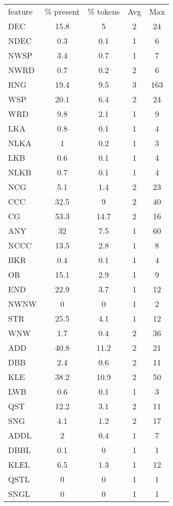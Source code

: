 \begin{center}
\begin{tabular}{lcccc}
\toprule
feature & \% present & \% tokens & Avg & Max \\ 
DEC & 15.8 & 5 & 2 & 24 \\ 
\midrule
NDEC & 0.3 & 0.1 & 1 & 6 \\ 
\midrule
NWSP & 3.4 & 0.7 & 1 & 7 \\ 
\midrule
NWRD & 0.7 & 0.2 & 2 & 6 \\ 
\midrule
RNG & 19.4 & 9.5 & 3 & 163 \\ 
\midrule
WSP & 20.1 & 6.4 & 2 & 24 \\ 
\midrule
WRD & 9.8 & 2.1 & 1 & 9 \\ 
\midrule
LKA & 0.8 & 0.1 & 1 & 4 \\ 
\midrule
NLKA & 1 & 0.2 & 1 & 3 \\ 
\midrule
LKB & 0.6 & 0.1 & 1 & 4 \\ 
\midrule
NLKB & 0.7 & 0.1 & 1 & 4 \\ 
\midrule
NCG & 5.1 & 1.4 & 2 & 23 \\ 
\midrule
CCC & 32.5 & 9 & 2 & 40 \\ 
\midrule
CG & 53.3 & 14.7 & 2 & 16 \\ 
\midrule
ANY & 32 & 7.5 & 1 & 60 \\ 
\midrule
NCCC & 13.5 & 2.8 & 1 & 8 \\ 
\midrule
BKR & 0.4 & 0.1 & 1 & 4 \\ 
\midrule
OR & 15.1 & 2.9 & 1 & 9 \\ 
\midrule
END & 22.9 & 3.7 & 1 & 12 \\ 
\midrule
NWNW & 0 & 0 & 1 & 2 \\ 
\midrule
STR & 25.5 & 4.1 & 1 & 12 \\ 
\midrule
WNW & 1.7 & 0.4 & 2 & 36 \\ 
\midrule
ADD & 40.8 & 11.2 & 2 & 21 \\ 
\midrule
DBB & 2.4 & 0.6 & 2 & 11 \\ 
\midrule
KLE & 38.2 & 10.9 & 2 & 50 \\ 
\midrule
LWB & 0.6 & 0.1 & 1 & 3 \\ 
\midrule
QST & 12.2 & 3.1 & 2 & 11 \\ 
\midrule
SNG & 4.1 & 1.2 & 2 & 17 \\ 
\midrule
ADDL & 2 & 0.4 & 1 & 7 \\ 
\midrule
DBBL & 0.1 & 0 & 1 & 1 \\ 
\midrule
KLEL & 6.5 & 1.3 & 1 & 12 \\ 
\midrule
QSTL & 0 & 0 & 1 & 1 \\ 
\midrule
SNGL & 0 & 0 & 1 & 1 \\ 
\midrule
\bottomrule
\end{tabular}
\end{center}
